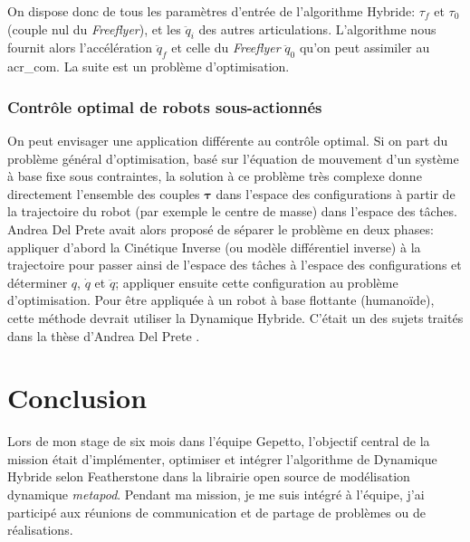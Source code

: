 \documentclass{report}
\begin{document}
On dispose donc de tous les paramètres d'entrée de l'algorithme Hybride: $\tau_f$ et $\tau_0$(couple nul du \emph{Freeflyer}), et les $\ddot{q}_i$ des autres articulations. L'algorithme nous fournit alors l'accélération $\ddot{q}_f$ et celle du \emph{Freeflyer} $\ddot{q}_0$ qu'on peut assimiler au \gls{acr_com}. La suite est un problème d'optimisation.

\subsection{Contrôle optimal de robots sous-actionnés}

On peut envisager une application différente au contrôle optimal. Si on part du problème général d'optimisation, basé sur l'équation de mouvement d'un système à base fixe sous contraintes, la solution à ce problème très complexe donne directement l'ensemble des couples $\mathbf{\tau}$ dans l'espace des configurations à partir de la trajectoire du robot (par exemple le centre de masse) dans l'espace des tâches. Andrea Del Prete avait alors proposé \cite{bib_paper_Andrea} de séparer le problème en deux phases: appliquer d'abord la Cinétique Inverse (ou modèle différentiel inverse) à la trajectoire pour passer ainsi de l'espace des tâches à l'espace des configurations et déterminer $q$, $\dot{q}$ et $\ddot{q}$; appliquer ensuite cette configuration au problème d'optimisation. Pour être appliquée à un robot à base flottante (humanoïde), cette méthode devrait utiliser la Dynamique Hybride. C'était un des sujets traités dans la thèse d'Andrea Del Prete \cite{bib_these_andrea}.



\chapter*{Conclusion}
%



Lors de mon stage de six mois dans l'équipe Gepetto, l'objectif central de la mission était d'implémenter, optimiser et intégrer l'algorithme de Dynamique Hybride selon Featherstone dans la librairie open source de modélisation dynamique \emph{metapod}. Pendant ma mission, je me suis intégré à l'équipe, j'ai participé aux réunions de communication et de partage de problèmes ou de réalisations.
\end{document}
